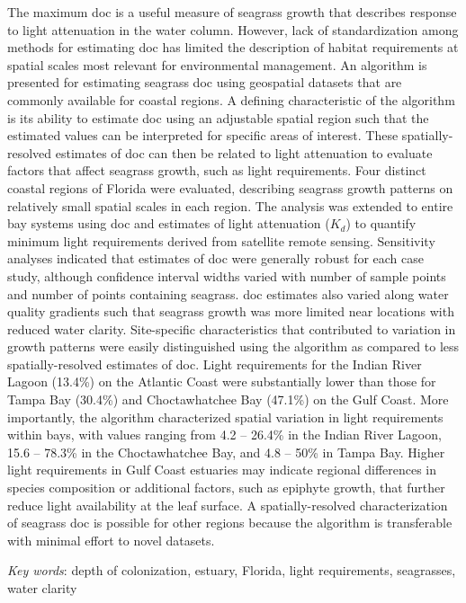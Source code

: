 \documentclass[letterpaper,12pt,oneside]{article}\usepackage[]{graphicx}\usepackage[]{color}
\begin{document}
The maximum \ac{doc} is a useful measure of seagrass growth that describes response to light attenuation in the water column.  However, lack of standardization among methods for estimating \ac{doc} has limited the description of habitat requirements at spatial scales most relevant for environmental management.  An algorithm is presented for estimating seagrass \ac{doc} using geospatial datasets that are commonly available for coastal regions.  A defining characteristic of the algorithm is its ability to estimate \ac{doc} using an adjustable spatial region such that the estimated values can be interpreted for specific areas of interest.  These spatially-resolved estimates of \ac{doc} can then be related to light attenuation to evaluate factors that affect seagrass growth, such as light requirements.  Four distinct coastal regions of Florida were evaluated, describing seagrass growth patterns on relatively small spatial scales in each region.  The analysis was extended to entire bay systems using \ac{doc} and estimates of light attenuation ($K_{d}$) to quantify minimum light requirements derived from satellite remote sensing.  Sensitivity analyses indicated that estimates of \ac{doc} were generally robust for each case study, although confidence interval widths varied with number of sample points and number of points containing seagrass.  \ac{doc} estimates also varied along water quality gradients such that seagrass growth was more limited near locations with reduced water clarity. Site-specific characteristics that contributed to variation in growth patterns were easily distinguished using the algorithm as compared to less spatially-resolved estimates of \ac{doc}.  Light requirements for the Indian River Lagoon (13.4\%) on the Atlantic Coast were substantially lower than those for Tampa Bay (30.4\%) and Choctawhatchee Bay (47.1\%) on the Gulf Coast.  More importantly, the algorithm characterized spatial variation in light requirements within bays, with values ranging from 4.2 -- 26.4\% in the Indian River Lagoon, 15.6 -- 78.3\% in the Choctawhatchee Bay, and 4.8 -- 50\% in Tampa Bay.  Higher light requirements in Gulf Coast estuaries may indicate regional differences in species composition or additional factors, such as epiphyte growth, that further reduce light availability at the leaf surface.  A spatially-resolved characterization of seagrass \ac{doc} is possible for other regions because the algorithm is transferable with minimal effort to novel datasets.

\noindent \textit{Key words}: depth of colonization, estuary, Florida, light requirements, seagrasses, water clarity
\end{document}

